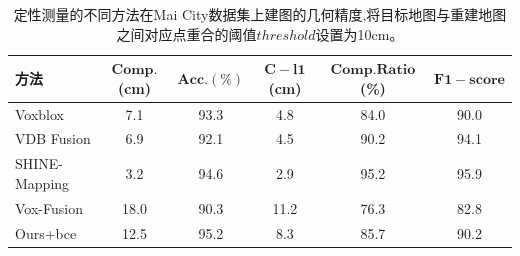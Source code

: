 \begin{table}[htbp]
    \centering
    \caption{定性测量的不同方法在Mai City数据集上建图的几何精度,将目标地图与重建地图之间对应点重合的阈值$threshold$设置为10cm。}\label{maicitymetric}
    \begin{tabular}[htbp]{llccccc}
        \toprule
        \multicolumn{2}{l}{方法} & $\mathbf{Comp.}$(cm) & $\mathbf{Acc.}(\%)$ & $\mathbf{C-l1}$(cm) &  $\mathbf{Comp. Ratio}$(\%) &$\mathbf{F1-score}$\\
        \midrule
        \multicolumn{2}{l}{Voxblox} & 7.1 & 93.3 & 4.8 &84.0&90.0\\
        \multicolumn{2}{l}{VDB Fusion} & 6.9&92.1&4.5&90.2&94.1 \\
        \multicolumn{2}{l}{SHINE-Mapping} & 3.2&94.6&2.9&95.2&95.9 \\
        \multicolumn{2}{l}{Vox-Fusion} & 18.0 & 90.3 &11.2&76.3&82.8\\
        \midrule
        \multicolumn{2}{l}{Ours+bce} & 12.5&95.2 &8.3&85.7&90.2\\
        \bottomrule
    \end{tabular}
\end{table}
